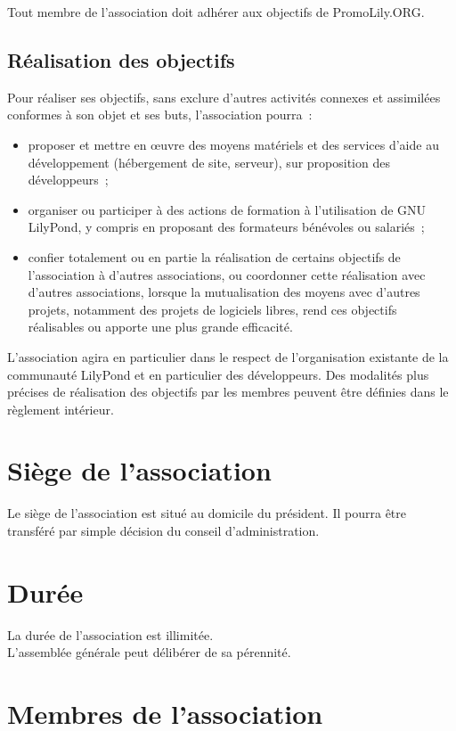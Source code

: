\documentclass[a4wide,12pt]{scrartcl}
\newcommand{\nomAssoc}{PromoLily.ORG\xspace}
\begin{document}
Tout membre de l'association doit adhérer aux objectifs de \nomAssoc.

\subsection{Réalisation des objectifs}

Pour réaliser ses objectifs, sans exclure d'autres activités connexes
et assimilées conformes à son objet et ses buts, l'association pourra~:
\begin{itemize}
\item proposer et mettre en œuvre des moyens matériels et des services
  d'aide au développement (hébergement de site, serveur), sur
  proposition des développeurs~;
\item organiser ou participer à des actions de formation à
  l'utilisation de GNU LilyPond, y compris en proposant des formateurs
  bénévoles ou salariés~;
\item confier totalement ou en partie la réalisation de certains
  objectifs de l'association à d'autres associations, ou coordonner
  cette réalisation avec d'autres associations, lorsque la
  mutualisation des moyens avec d'autres projets, notamment des
  projets de logiciels libres, rend ces objectifs réalisables ou
  apporte une plus grande efficacité.
\end{itemize}

L'association agira en particulier dans le respect de l'organisation
existante de la communauté LilyPond et en particulier des
développeurs. Des modalités plus précises de réalisation des objectifs
par les membres peuvent être définies dans le règlement intérieur.

\section{Siège de l'association}

Le siège de l'association est situé au domicile du président. Il
pourra être transféré par simple décision du conseil d'administration.


\section{Durée}

La durée de l'association est illimitée.\\ 
L'assemblée générale peut délibérer de sa pérennité.

\section{Membres de l'association}
\end{document}
